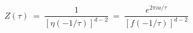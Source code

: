 \begin{equation}\label{8}
Z(\tau ) ~=~  \frac{1}{\left[ \eta (-1/\tau) \right]^{d-2}}~=~ \frac{e^{2\pi
ia/\tau}} 
{\left[f(-{1}/{\tau})\right]^{d-2}}
\end{equation}

